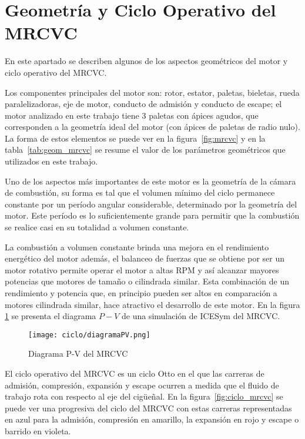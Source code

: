 \section{Geometría y Ciclo Operativo del MRCVC}
%
En este apartado se describen algunos de los aspectos geométricos del motor y
ciclo operativo del MRCVC.

Los componentes principales del motor son: rotor, estator, paletas, bieletas,
rueda paralelizadoras, eje de motor, conducto de admisión y conducto de escape;
el motor analizado en este trabajo tiene 3 paletas con ápices agudos, que
corresponden a la geometría ideal del motor (con ápices de paletas de radio
nulo).
%
La forma de estos elementos se puede ver en la figura~\ref{fig:mrcvc} y en la
tabla~\ref{tab:geom_mrcvc} se resume el valor de los parámetros geométricos que
utilizados en este trabajo.


Uno de los aspectos más importantes de este motor es la geometría de la cámara
de combustión, su forma es tal que el volumen mínimo del ciclo permanece
constante por un período angular considerable, determinado por la geometría del
motor.
%
Este período es lo suficientemente grande para permitir que la combustión se
realice casi en su totalidad a volumen constante.
%

La combustión a volumen constante brinda una mejora en el rendimiento energético
del motor además, el balanceo de fuerzas que se obtiene por ser un motor
rotativo permite operar el motor a altas RPM y así alcanzar mayores potencias
que motores de tamaño o cilindrada similar.
%
Esta combinación de un rendimiento y potencia que, en principio pueden ser altos
en comparación a motores cilindrada similar, hace atractivo el desarrollo de
este motor.
%
En la figura \ref{fig:ciclo_pv_mrcvc} se presenta el diagrama $P-V$ de una
simulación de ICESym del MRCVC.
%
\begin{figure} \centering
    \texttt{[image: ciclo/diagramaPV.png]}
    \caption{Diagrama P-V del MRCVC}\label{fig:ciclo_pv_mrcvc}
\end{figure}


El ciclo operativo del MRCVC es un ciclo Otto en el que las carreras de
admisión, compresión, expansión y escape ocurren a medida que el fluido de
trabajo rota con respecto al eje del cigüeñal.
%
En la figura~\ref{fig:ciclo_mrcvc} se puede ver una progresiva del ciclo del
MRCVC con estas carreras representadas en azul para la admisión, compresión en
amarillo, la expansión en rojo y escape o barrido en violeta.

